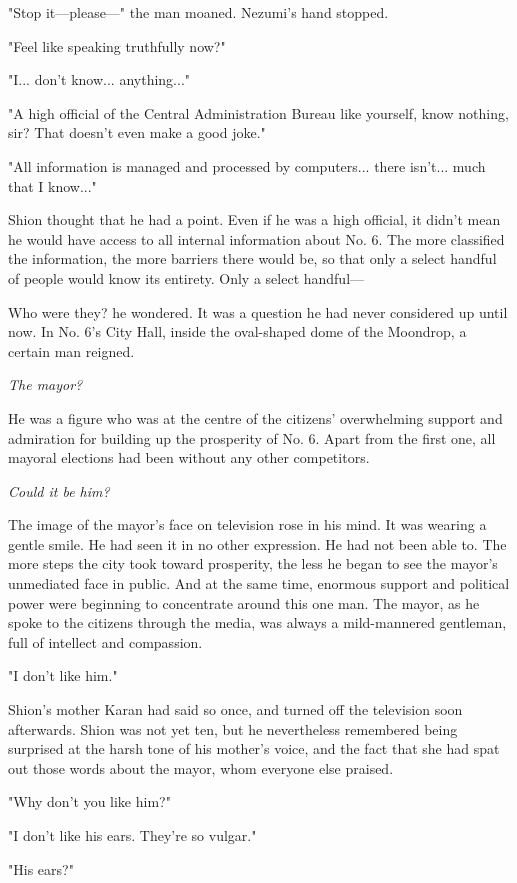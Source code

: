 "Stop it---please---" the man moaned. Nezumi's hand stopped.

"Feel like speaking truthfully now?"

"I... don't know... anything..."

"A high official of the Central Administration Bureau like yourself,
know nothing, sir? That doesn't even make a good joke."

"All information is managed and processed by computers... there isn't...
much that I know..."

Shion thought that he had a point. Even if he was a high official, it
didn't mean he would have access to all internal information about No.
6. The more classified the information, the more barriers there would
be, so that only a select handful of people would know its entirety.
Only a select handful---

Who were they? he wondered. It was a question he had never considered up
until now. In No. 6's City Hall, inside the oval-shaped dome of the
Moondrop, a certain man reigned.

\emph{The mayor?}

He was a figure who was at the centre of the citizens' overwhelming
support and admiration for building up the prosperity of No. 6. Apart
from the first one, all mayoral elections had been without any other
competitors.

\emph{Could it be him?}

The image of the mayor's face on television rose in his mind. It was
wearing a gentle smile. He had seen it in no other expression. He had
not been able to. The more steps the city took toward prosperity, the
less he began to see the mayor's unmediated face in public. And at the
same time, enormous support and political power were beginning to
concentrate around this one man. The mayor, as he spoke to the citizens
through the media, was always a mild-mannered gentleman, full of
intellect and compassion.

"I don't like him."

Shion's mother Karan had said so once, and turned off the television
soon afterwards. Shion was not yet ten, but he nevertheless remembered
being surprised at the harsh tone of his mother's voice, and the fact
that she had spat out those words about the mayor, whom everyone else
praised.

"Why don't you like him?"

"I don't like his ears. They're so vulgar."

"His ears?"

